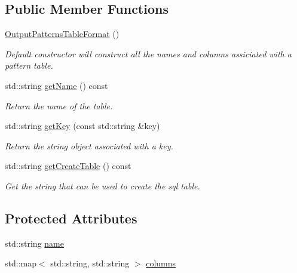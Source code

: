 \subsection*{\-Public \-Member \-Functions}
\begin{DoxyCompactItemize}
\item 
\hyperlink{structcryomesh_1_1manager_1_1OutputPatternsTableFormat_af0c661dee8b2943cbb369a2704fccbb9}{\-Output\-Patterns\-Table\-Format} ()
\begin{DoxyCompactList}\small\item\em \-Default constructor will construct all the names and columns assiciated with a pattern table. \end{DoxyCompactList}\item 
std\-::string \hyperlink{structcryomesh_1_1manager_1_1TableFormat_a3e797d6130c6b0745a1fac799c25677a}{get\-Name} () const 
\begin{DoxyCompactList}\small\item\em \-Return the name of the table. \end{DoxyCompactList}\item 
std\-::string \hyperlink{structcryomesh_1_1manager_1_1TableFormat_a2256ce39471582b92bf7cbb6eec74d30}{get\-Key} (const std\-::string \&key)
\begin{DoxyCompactList}\small\item\em \-Return the string object associated with a key. \end{DoxyCompactList}\item 
std\-::string \hyperlink{structcryomesh_1_1manager_1_1TableFormat_a898ae0d0c5490ccdf71aec5156b10fcc}{get\-Create\-Table} () const 
\begin{DoxyCompactList}\small\item\em \-Get the string that can be used to create the sql table. \end{DoxyCompactList}\end{DoxyCompactItemize}
\subsection*{\-Protected \-Attributes}
\begin{DoxyCompactItemize}
\item 
std\-::string \hyperlink{structcryomesh_1_1manager_1_1TableFormat_ab49912897ccb7fd0f8d42f1cc21332e8}{name}
\item 
std\-::map$<$ std\-::string, \*
std\-::string $>$ \hyperlink{structcryomesh_1_1manager_1_1TableFormat_a29ab6f4cfc0c56da1fa461ea665a1b61}{columns}
\end{DoxyCompactItemize}


